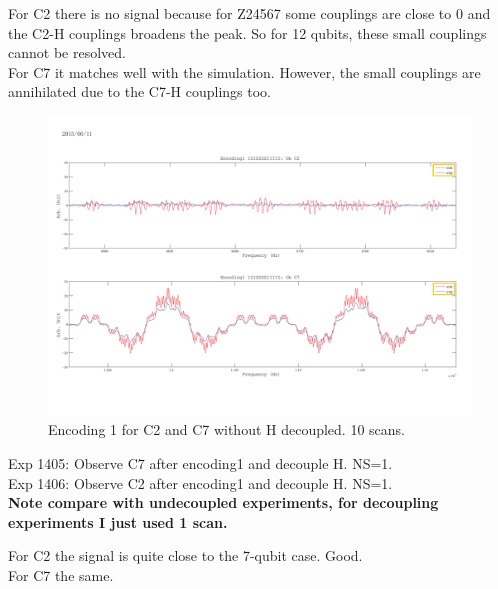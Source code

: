 \documentclass[prl,onecolumn]{revtex4-1}
\begin{document}
For C2 there is no signal because for Z24567 some couplings are close to 0 and the C2-H couplings broadens the peak. So for 12 qubits, these small couplings cannot be resolved.\\
For C7 it matches well with the simulation. However, the small couplings are annihilated due to the C7-H couplings too.

\begin{figure}[htb]
\begin{center}
\includegraphics[width=\columnwidth]{Encoding1_without_decouple.pdf}
\end{center}
\setlength{\abovecaptionskip}{-0.35cm}
\caption{\footnotesize{Encoding 1 for C2 and C7 without H decoupled. 10 scans.}}\label{1403and1404}
\end{figure}

\clearpage
Exp 1405: Observe C7 after encoding1 and decouple H. NS=1.\\
Exp 1406: Observe C2 after encoding1 and decouple H. NS=1.\\
\textbf{Note compare with undecoupled experiments, for decoupling experiments I just used 1 scan.}

For C2 the signal is quite close to the 7-qubit case. Good.\\
For C7 the same.
\end{document}
